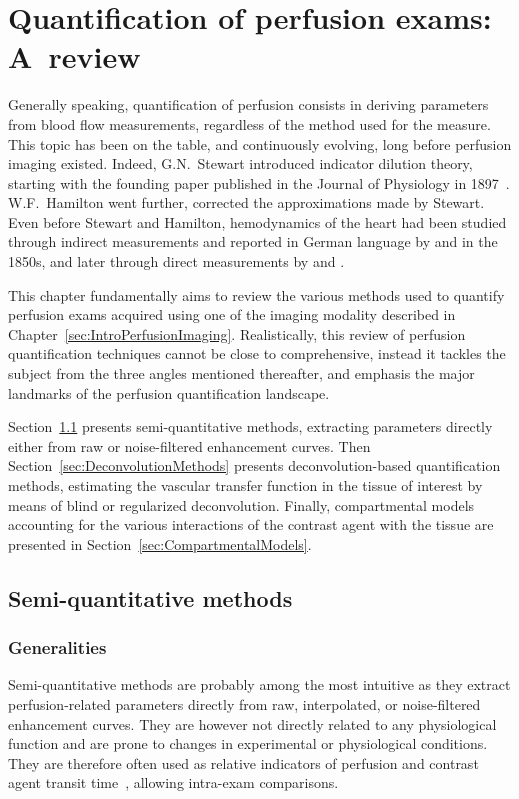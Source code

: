 \chapter{Quantification of perfusion exams: A~review}\label{chapter:review}

Generally speaking, quantification of perfusion consists in deriving parameters from blood flow measurements, regardless of the method used for the measure. 
This topic has been on the table, and continuously evolving, long before perfusion imaging existed. 
Indeed, G.N.~Stewart introduced indicator dilution theory, starting with the founding paper published in the Journal of Physiology in 1897~\cite{Stewart:1897dz}. 
W.F.~Hamilton went further, corrected the approximations made by Stewart.
Even before Stewart and Hamilton, hemodynamics of the heart had been studied  through indirect measurements and reported in German language by \citet{Volkmann:1850us} and \citet{Vierordt:82xUDMVI} in the 1850s, and later through direct measurements by \citet{Stolnikow:1886wm} and \citet{Tigerstedt:1891wn}.

This chapter fundamentally aims to review the various methods used to quantify perfusion exams acquired using one of the imaging modality described in Chapter~\ref{sec:IntroPerfusionImaging}. 
Realistically, this review of perfusion quantification techniques cannot be close to comprehensive, instead it tackles the subject from the three angles mentioned thereafter, and emphasis the major landmarks of the perfusion quantification landscape.

Section~\ref{sec:SQMethods} presents semi-quantitative methods, extracting parameters directly either from raw or noise-filtered enhancement curves. 
Then Section~\ref{sec:DeconvolutionMethods} presents deconvolution-based quantification methods, estimating the vascular transfer function in the tissue of interest by means of blind or regularized deconvolution.
Finally, compartmental models accounting for the various interactions of the contrast agent with the tissue are presented in Section~\ref{sec:CompartmentalModels}. 

\section{Semi-quantitative methods}
\label{sec:SQMethods}
\subsection{Generalities}
Semi-quantitative methods are probably among the most intuitive as they extract perfusion-related parameters directly from raw, interpolated, or noise-filtered enhancement curves.
They are however not directly related to any physiological function and are prone to changes in experimental or physiological conditions.
They are therefore often used as relative indicators of perfusion and contrast agent transit time~\cite{Miles:1991et}, allowing intra-exam comparisons.

